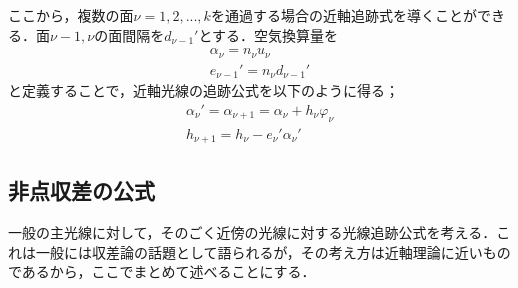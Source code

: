 \documentclass{jsarticle}
\begin{document}
ここから，複数の面$\nu=1,2,...,k$を通過する場合の近軸追跡式を導くことができる．面$\nu-1,\nu$の面間隔を$d_{\nu-1}'$とする．空気換算量を
\begin{gather}
    \alpha_\nu=n_\nu u_\nu\\
    e_{\nu-1}'=n_\nu d_{\nu-1}'
\end{gather}
と定義することで，近軸光線の追跡公式を以下のように得る；
\begin{gather}
    \alpha_\nu'=\alpha_{\nu+1}=\alpha_\nu +h_\nu\varphi_\nu\\
    h_{\nu+1}=h_\nu-e_\nu'\alpha_\nu'
\end{gather}

\subsection{非点収差の公式}
\label{subsec:astigmatic_paraxial_tracing}
一般の主光線に対して，そのごく近傍の光線に対する光線追跡公式を考える．これは一般には収差論の話題として語られるが，その考え方は近軸理論に近いものであるから，ここでまとめて述べることにする．
%
\end{document}
